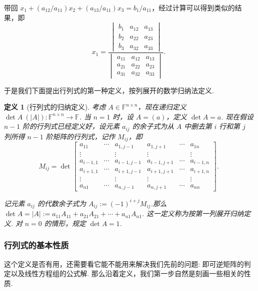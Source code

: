 \documentclass[10pt,openany]{article}
\theoremstyle{thmstyle} %
\theoremstyle{defstyle} %
\newtheorem{definition}[theorem]{定义}
\theoremstyle{prostyle} %
\theoremstyle{exastyle}
\theoremstyle{remstyle}
\newcommand{\F}{\mathbb{F}}
\newcommand{\n}{^{n \times n}}
\begin{document}
带回 \( x_1+(a_{12}/a_{11})x_2+(a_{13}/a_{11}) x_3=b_1/a_{11} \)，经过计算可以得到类似的结果，即
\[ x_1=\frac{\begin{vmatrix}
		b_{1} & a_{12} & a_{13} \\
		b_{2} & a_{22} & a_{23} \\
		b_{3} & a_{32} & a_{33} 
\end{vmatrix}}{\begin{vmatrix}
		a_{11} & a_{12} & a_{13} \\
		a_{21} & a_{22} & a_{23} \\
		a_{31} & a_{32} & a_{33} 
\end{vmatrix}}. \]

于是我们下面提出行列式的第一种定义，按列展开的数学归纳法定义.

\begin{definition}[行列式的归纳定义]\label{2.2.1}
	考虑 \( A \in \F\n \)，现在递归定义 \( \det A \ (|A|): \F\n \to \F \). 当 \( n=1 \) 时，设 \( A=(a) \)，定义 \( \det A=a \). 现在假设 \( n-1 \) 阶的行列式已经定义好，设元素 \( a_{ij} \) 的余子式为从 \( A \) 中删去第 \( i \) 行和第 \( j \) 列所得 \( n-1 \) 阶矩阵的行列式，记作 \( M_{ij} \)，即
	\[ M_{ij}=\det \begin{bmatrix}
		a_{11} & \cdots & a_{1,j-1} & a_{1,j+1} & \cdots & a_{1n} \\
		\vdots &        & \vdots   & \vdots   &        & \vdots \\
		a_{i-1,1} & \cdots & a_{i-1,j-1} & a_{i-1,j+1} & \cdots & a_{i-1,n} \\
		a_{i+1,1} & \cdots & a_{i+1,j-1} & a_{i+1,j+1} & \cdots & a_{i+1,n} \\
		\vdots &        & \vdots   & \vdots   &        & \vdots \\
		a_{n1} & \cdots & a_{n,j-1} & a_{n,j+1} & \cdots & a_{nn}
	\end{bmatrix}. \]
	
	记元素 \( a_{ij} \) 的代数余子式为 \( A_{ij}:=(-1)^{i+j}M_{ij} \).那么 \( \det A=|A|:= a_{11}A_{11}+a_{21}A_{21}+\cdots+a_{n1}A_{n1} \). 这一定义称为按第一列展开归纳定义. 对 \( n=0 \) 的情形，规定 \( \det A=1 \).
	
\end{definition}

\subsubsection{行列式的基本性质}

这个定义是否有用，还需要看它能不能用来解决我们先前的问题: 即可逆矩阵的判定以及线性方程组的公式解. 那么沿着定义，我们第一步自然是刻画一些相关的性质.
\end{document}
